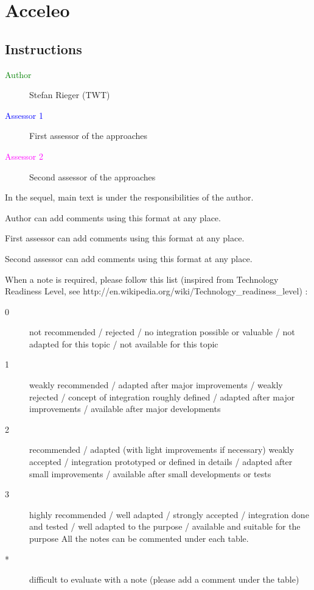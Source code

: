 \chapter{Acceleo}
\label{sec:acceleo}

\section{Instructions}

\begin{description}
\item[\textcolor{green}{Author}] Stefan Rieger (TWT)
\item[\textcolor{blue}{Assessor 1}] First assessor of the approaches 
\item[\textcolor{magenta}{Assessor 2}] Second assessor of the approaches 
\end{description}

In the sequel, main text is under the responsibilities of the author.

\begin{author_comment}
Author can add comments using this format at any place.
\end{author_comment}

\begin{assessor1}
First assessor can add comments using this format at any place.
\end{assessor1}

\begin{assessor2}
Second assessor can add comments using this format at any place.
\end{assessor2}


When a note is required, please follow this list (inspired from Technology Readiness Level, see http://en.wikipedia.org/wiki/Technology\_readiness\_level) :

\begin{description}
\item[0] not recommended / rejected / no integration possible or valuable / not adapted for this topic / not available for this topic
\item[1] weakly recommended / adapted after major improvements / weakly rejected / concept of integration roughly defined / adapted after major improvements / available after major developments
\item[2] recommended / adapted (with light improvements if necessary)  weakly accepted / integration prototyped or defined in details / adapted after small improvements / available after small developments or tests
\item[3] highly recommended / well adapted / strongly accepted / integration done and tested / well adapted to the purpose / available and suitable for the purpose All the notes can be commented under each table.
\item[*] difficult to evaluate with a note (please add a comment under the table)
\end{description}

